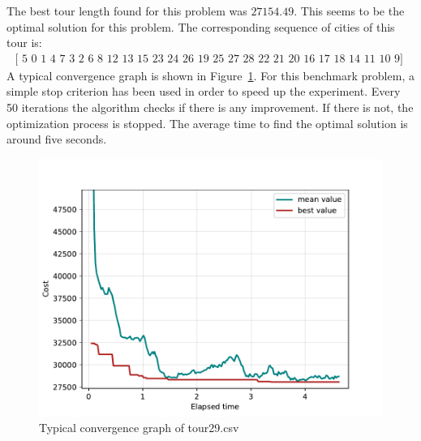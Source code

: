 \documentclass[a4paper,10pt]{article}
\begin{document}
The best tour length found for this problem was $27154.49$. This seems to be the optimal solution for this problem. The corresponding sequence of cities of this tour is: 
\begin{align*}
    \text{[ 5  0  1  4  7  3  2  6  8 12 13 15 23 24 26 19 25 27 28 22 21 20 16 17 18 14 11 10  9] }
\end{align*}
A typical convergence graph is shown in Figure~\ref{fig:convergence}. For this benchmark problem, a simple stop criterion has been used in order to speed up the experiment. Every 50 iterations the algorithm checks if there is any improvement. If there is not, the optimization process is stopped. The average time to find the optimal solution is around five seconds. 
\begin{figure}[H]
    \centering
    \includegraphics[width=.8\linewidth]{img/convergence.pdf}
    \caption{Typical convergence graph of tour29.csv}
    \label{fig:convergence}
\end{figure}
\end{document}
